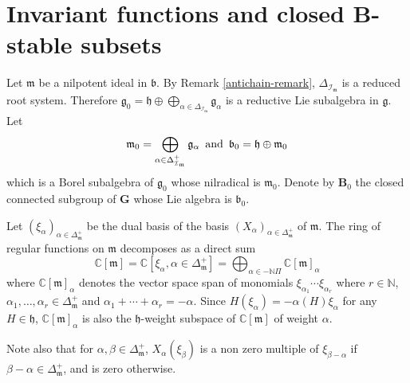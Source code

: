 \documentclass{amsart}
\theoremstyle{definition}
\theoremstyle{remark}
\numberwithin{equation}{section}
\newcommand{\soc}[1]{\mathcal{I}_{#1}}
\newcommand{\group}[1]{\mathbf{#1}}
\begin{document}

\section{Invariant functions and closed $\group{B}$-stable subsets}\label{sec:uniqueness}

Let $\mathfrak{m}$ be a nilpotent ideal in $\mathfrak{b}$. 
By Remark \ref{antichain-remark}, $\Delta_{\soc{\mathfrak{m}}}$ is a reduced root system. Therefore
$
\mathfrak{g}_{0} = \mathfrak{h} \oplus \bigoplus_{\alpha\in \Delta_{\soc{\mathfrak{m}}}}
\mathfrak{g}_{\alpha}
$
is a reductive Lie subalgebra in $\mathfrak{g}$. Let 
$$
\mathfrak{m}_{0} = \bigoplus_{\alpha\in \Delta_{\soc{\mathfrak{m}}}^{+}}
\mathfrak{g}_{\alpha} \, \hbox{ and } \,
\mathfrak{b}_{0} = \mathfrak{h}\oplus \mathfrak{m}_{0}
$$
which is a Borel subalgebra of $\mathfrak{g}_{0}$ whose nilradical is 
$\mathfrak{m}_{0}$.
Denote by $\group{B}_{0}$ the closed connected subgroup of $\group{G}$ 
whose Lie algebra is $\mathfrak{b}_{0}$.

Let $(\xi_{\alpha})_{\alpha\in \Delta_{{\mathfrak{m}}}^{+}}$ be the dual basis of 
the basis $(X_{\alpha})_{\alpha\in \Delta_{{\mathfrak{m}}}^{+}}$ of $\mathfrak{m}$.
The ring of regular functions on $\mathfrak{m}$ decomposes
as a direct sum 
$$
\mathbb{C} [\mathfrak{m}] = \mathbb{C} [\xi_{\alpha}, \alpha\in \Delta_{\mathfrak{m}}^{+}] = 
\bigoplus_{\alpha\in -\mathbb{N}\Pi} \mathbb{C} [\mathfrak{m}]_{\alpha}
$$
where 
$\mathbb{C} [\mathfrak{m}]_{\alpha}$ denotes
the vector space span of monomials  $\xi_{\alpha_{1}}\cdots \xi_{\alpha_{r}}$ where
$r\in\mathbb{N}$, $\alpha_{1},\dots ,\alpha_{r}\in\Delta_{\mathfrak{m}}^{+}$ and
$\alpha_{1}+\cdots + \alpha_{r} = -\alpha$. Since $H ( \xi_{\alpha} ) = -\alpha (H) \xi_{\alpha}$
for any $H\in\mathfrak{h}$, 
$\mathbb{C} [\mathfrak{m}]_{\alpha}$ is also the $\mathfrak{h}$-weight 
subspace of $\mathbb{C} [\mathfrak{m}]$ of weight $\alpha$.

Note also that for $\alpha,\beta \in \Delta_{\mathfrak{m}}^{+}$, 
$X_{\alpha} ( \xi_{\beta} )$ is a non zero multiple of $\xi_{\beta-\alpha}$ if  
$\beta - \alpha \in \Delta_{\mathfrak{m}}^{+}$, and is zero otherwise.
\end{document}

